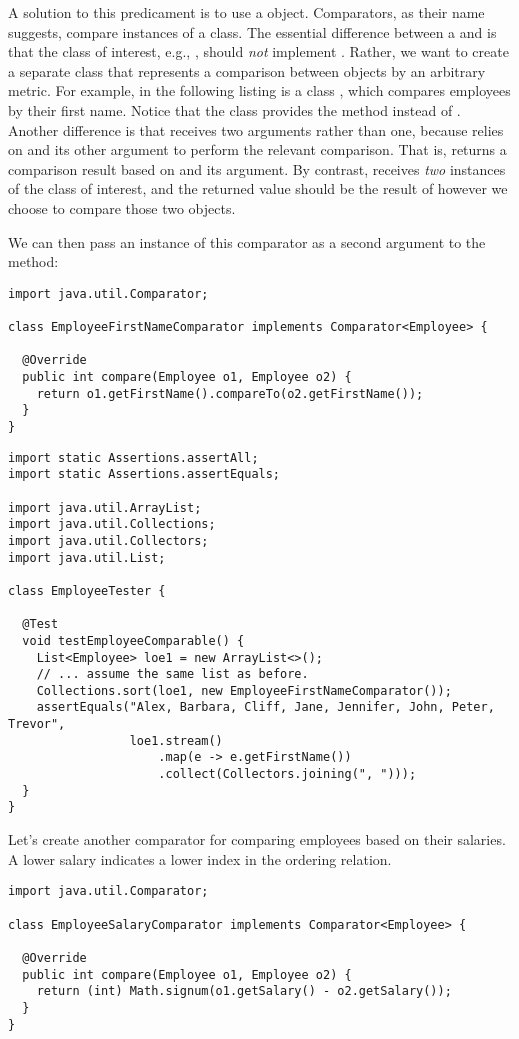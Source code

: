 A solution to this predicament is to use a  object. 
Comparators, as their name suggests, compare instances of a class. 
The essential difference between a  and  is that the class of interest, e.g., , should \emph{not} implement . 
Rather, we want to create a separate class that represents a comparison between  objects by an arbitrary metric. 
For example, in the following listing is a class , which compares employees by their first name. 
Notice that the  class provides the  method instead of . 
Another difference is that  receives two arguments rather than one, because  relies on  and its other argument to perform the relevant comparison. 
That is,  returns a comparison result based on  and its argument. 
By contrast,  receives \emph{two} instances of the class of interest, and the returned value should be the result of however we choose to compare those two objects.

We can then pass an instance of this comparator as a second argument to the  method:

\begin{lstlisting}[language=MyJava]
import java.util.Comparator;

class EmployeeFirstNameComparator implements Comparator<Employee> {

  @Override
  public int compare(Employee o1, Employee o2) {
    return o1.getFirstName().compareTo(o2.getFirstName());
  }
}
\end{lstlisting}

\enlargethispage{2\baselineskip}
\begin{lstlisting}[language=MyJava]
import static Assertions.assertAll;
import static Assertions.assertEquals;

import java.util.ArrayList;
import java.util.Collections;
import java.util.Collectors;
import java.util.List;

class EmployeeTester {

  @Test
  void testEmployeeComparable() {
    List<Employee> loe1 = new ArrayList<>();
    // ... assume the same list as before.
    Collections.sort(loe1, new EmployeeFirstNameComparator());
    assertEquals("Alex, Barbara, Cliff, Jane, Jennifer, John, Peter, Trevor",
                 loe1.stream()
                     .map(e -> e.getFirstName())
                     .collect(Collectors.joining(", ")));
  }
}
\end{lstlisting}

Let's create another comparator for comparing employees based on their salaries. 
A lower salary indicates a lower index in the ordering relation.

\begin{lstlisting}[language=MyJava]
import java.util.Comparator;

class EmployeeSalaryComparator implements Comparator<Employee> {

  @Override
  public int compare(Employee o1, Employee o2) {
    return (int) Math.signum(o1.getSalary() - o2.getSalary());
  }
}
\end{lstlisting}
